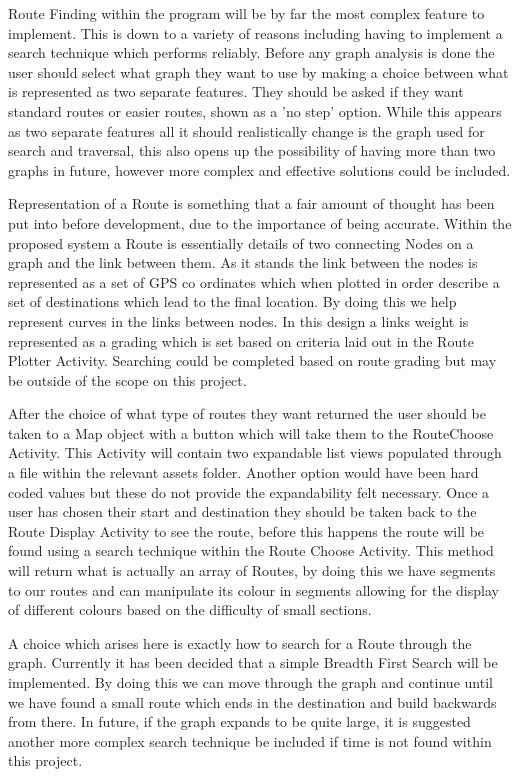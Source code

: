 Route Finding within the program will be by far the most complex feature to implement. This is down to a variety of reasons including having to implement a search technique which performs reliably. Before any graph analysis is done the user should select
 what graph they want to use by making a choice between what is represented as two separate features. They should be asked if they want standard routes or easier routes, shown as a 'no step' option. While this appears as two separate features all it should realistically change is the graph used for search and traversal, this also opens up the possibility of having more than two graphs in future, however more complex and effective solutions could be included. 
 
Representation of a Route is something that a fair amount of thought has been put into before development, due to the importance of being accurate. Within the proposed system a Route is essentially details of two connecting Nodes on a graph and the link between them. As it stands the link between the nodes is represented as a set of GPS co ordinates which when plotted in order describe a set of destinations which lead to the final location. By doing this we help represent curves in the links between nodes. In this design a links weight is represented as a grading which is set based on criteria laid out in the Route Plotter Activity. Searching could be completed based on route grading but may be outside of the scope on this project. 
 
After the choice of what type of routes they want returned the user should be taken to a Map object with a button which will take them to the RouteChoose Activity. This Activity will contain two expandable list views populated through a file within the relevant assets folder. Another option would have been hard coded values but these do not provide the expandability felt necessary. Once a user has chosen their start and destination they should be taken back to the Route Display Activity to see the route, before this happens the route will be found using a search technique within the Route Choose Activity. This method will return what is actually an array of Routes, by doing this we have segments to our routes and can manipulate its colour in segments allowing for the display of different colours based on the difficulty of small sections.

A choice which arises here is exactly how to search for a Route through the graph. Currently it has been decided that a simple Breadth First Search\cite{bfs} will be implemented. By doing this we can move through the graph and continue until we have found a small route which ends in the destination and build backwards from there. In future, if the graph expands to be quite large, it is suggested another more complex search technique be included if time is not found within this project. 

